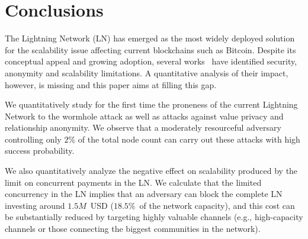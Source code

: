 \section{Conclusions}
\label{sec:conclusions}

The Lightning Network (LN) has emerged as the most widely deployed solution for the scalability issue affecting current blockchains such as Bitcoin. 
Despite its conceptual appeal and growing adoption,  several works~\cite{Malavolta2017, Malavolta2019} have identified 
 security, anonymity and scalability limitations. A quantitative 
analysis of their impact, however, is missing and this paper aims at filling this gap.

We quantitatively study for the first time the proneness of the current Lightning Network to the 
wormhole attack as well as attacks against value privacy and relationship anonymity. 
We observe that a moderately resourceful adversary controlling only $2\%$ of the total node count can carry out these attacks with high success probability.

We also quantitatively analyze the negative effect on scalability produced by the limit on concurrent payments in the LN. 
We calculate that the limited concurrency in the LN implies that an adversary can block the complete LN investing around $1.5M$~USD ($18.5\%$~of the network capacity), and this cost can be substantially reduced by targeting highly valuable channels (e.g., high-capacity channels or those connecting the biggest communities in the network).



